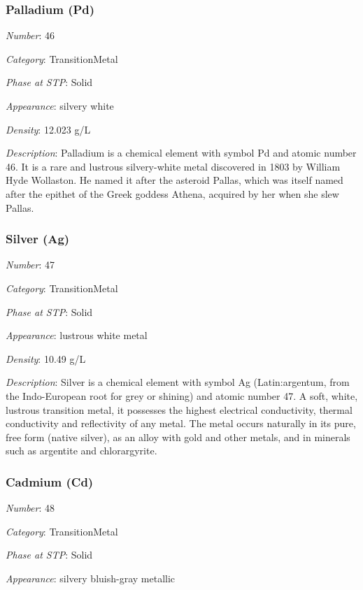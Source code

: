 \documentclass{article}
\begin{document}
\hypertarget{subsubsection::Pd}{}\subsubsection{Palladium (Pd)}

\textit{Number}: 46

\textit{Category}: TransitionMetal

\textit{Phase at STP}: Solid

\textit{Appearance}: silvery white

\textit{Density}: 12.023 g/L

\textit{Description}: Palladium is a chemical element with symbol Pd and atomic number 46. It is a rare and lustrous silvery-white metal discovered in 1803 by William Hyde Wollaston. He named it after the asteroid Pallas, which was itself named after the epithet of the Greek goddess Athena, acquired by her when she slew Pallas.

\hypertarget{subsubsection::Ag}{}\subsubsection{Silver (Ag)}

\textit{Number}: 47

\textit{Category}: TransitionMetal

\textit{Phase at STP}: Solid

\textit{Appearance}: lustrous white metal

\textit{Density}: 10.49 g/L

\textit{Description}: Silver is a chemical element with symbol Ag (Latin:argentum, from the Indo-European root for grey or shining) and atomic number 47. A soft, white, lustrous transition metal, it possesses the highest electrical conductivity, thermal conductivity and reflectivity of any metal. The metal occurs naturally in its pure, free form (native silver), as an alloy with gold and other metals, and in minerals such as argentite and chlorargyrite.

\hypertarget{subsubsection::Cd}{}\subsubsection{Cadmium (Cd)}

\textit{Number}: 48

\textit{Category}: TransitionMetal

\textit{Phase at STP}: Solid

\textit{Appearance}: silvery bluish-gray metallic
\end{document}

